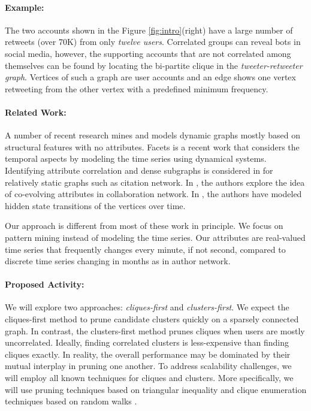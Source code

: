 \paragraph{Example:} The two accounts shown in the Figure \ref{fig:intro}(right) have a large number of retweets (over 70K) from only {\it twelve users}. Correlated groups can reveal bots in social media, however, the supporting accounts that are not correlated among themselves can be found by locating the bi-partite clique in the {\it tweeter-retweeter graph}. Vertices of such a graph are user accounts and an edge shows one vertex retweeting from the other vertex with a predefined minimum frequency.

\paragraph{Related Work:}

A number of recent research mines and models dynamic graphs mostly based on structural features \cite{Tong2008,Liangyue2015} with no attributes. Facets \cite{Yongjie2015} is a recent work that considers the temporal aspects by modeling the time series using dynamical systems. Identifying attribute correlation and dense subgraphs is considered in \cite{Silva2012} for relatively static graphs such as citation network. In \cite{CoDyn,trendDyn}, the authors explore the idea of co-evolving attributes in collaboration network. In \cite{Rossi2013}, the authors have modeled hidden state transitions of the vertices over time.

Our approach is different from most of these work in principle. We focus on pattern mining instead of modeling the time series. Our attributes are real-valued time series that frequently changes every minute, if not second, compared to discrete time series changing in months as in author network.






\paragraph{Proposed Activity:}

We will explore two approaches: {\it cliques-first} and {\it clusters-first}. We expect the cliques-first method to prune candidate clusters quickly on a sparsely connected graph. In contrast, the clusters-first method prunes cliques when users are mostly uncorrelated. Ideally, finding correlated clusters is less-expensive than finding cliques exactly. In reality, the overall performance may be dominated by their mutual interplay in pruning one another. To address scalability challenges, we will employ all known techniques for cliques and clusters. More specifically, we will use pruning techniques based on triangular inequality \cite{Mueen:09a,Jagadish:05} and clique enumeration techniques based on random walks \cite{Uno2008}.


